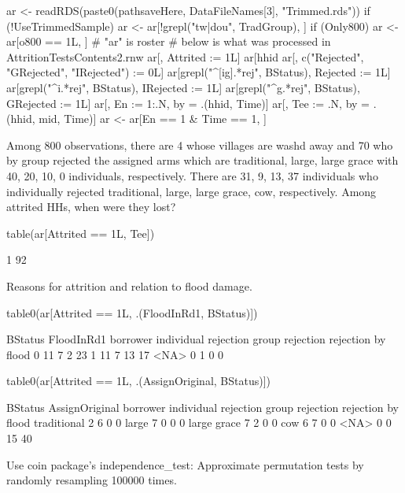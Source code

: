\begin{Schunk}
\begin{Sinput}
ar <- readRDS(paste0(pathsaveHere, DataFileNames[3], "Trimmed.rds"))
if (!UseTrimmedSample) ar <- ar[!grepl("tw|dou", TradGroup), ]
if (Only800) ar <- ar[o800 == 1L, ]
# "ar" is roster
# below is what was processed in AttritionTestsContents2.rnw
ar[, Attrited := 1L]
ar[hhid %in% hhid[Time == 4], Attrited := 0L]
ar[, c("Rejected", "GRejected", "IRejected") := 0L]
ar[grepl("^[ig].*rej", BStatus), Rejected := 1L]
ar[grepl("^i.*rej", BStatus), IRejected := 1L]
ar[grepl("^g.*rej", BStatus), GRejected := 1L]
ar[, En := 1:.N, by = .(hhid, Time)]
ar[, Tee := .N, by = .(hhid, mid, Time)]
ar <- ar[En == 1 & Time == 1, ]
\end{Sinput}
\end{Schunk}
Among 800 observations, there are 4 whose villages are washd away and 70 who by group rejected the assigned arms which are traditional, large, large grace with 40, 20, 10, 0 individuals, respectively. There are 31, 9, 13, 37 individuals who individually rejected traditional, large, large grace, cow, respectively. Among attrited HHs, when were they lost?
\begin{Schunk}
\begin{Sinput}
table(ar[Attrited == 1L, Tee])
\end{Sinput}
\begin{Soutput}

 1 
92 
\end{Soutput}
\end{Schunk}
Reasons for attrition and relation to flood damage.
\begin{Schunk}
\begin{Sinput}
table0(ar[Attrited == 1L, .(FloodInRd1, BStatus)])
\end{Sinput}
\begin{Soutput}
          BStatus
FloodInRd1 borrower individual rejection group rejection rejection by flood
      0          11                    7               2                 23
      1          11                    7              13                 17
      <NA>        0                    1               0                  0
\end{Soutput}
\begin{Sinput}
table0(ar[Attrited == 1L, .(AssignOriginal, BStatus)])
\end{Sinput}
\begin{Soutput}
              BStatus
AssignOriginal borrower individual rejection group rejection rejection by flood
   traditional        2                    6               0                  0
   large              7                    0               0                  0
   large grace        7                    2               0                  0
   cow                6                    7               0                  0
   <NA>               0                    0              15                 40
\end{Soutput}
\end{Schunk}
Use \textsf{coin} package's \textsf{independence\_test}: Approximate permutation tests by randomly resampling 100000 times.

